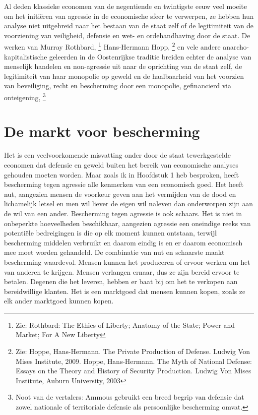 \documentclass[
  a5paper,
  smalldemyvopaper,11pt,twoside,onecolumn,openright,extrafontsizes,
hidelinks]{memoir}
\begin{document}
Al deden klassieke economen van de negentiende en twintigste eeuw veel
moeite om het initiëren van agressie in de economische sfeer te
verwerpen, ze hebben hun analyse niet uitgebreid naar het bestaan van de
staat zelf of de legitimiteit van de voorziening van veiligheid,
defensie en wet- en ordehandhaving door de staat. De werken van Murray
Rothbard, \footnote{Zie: Rothbard: The Ethics of Liberty; Anatomy of the
  State; Power and Market; For A New Liberty} Hans-Hermann Hopp,
\footnote{Zie: Hoppe, Hans-Hermann. The Private Production of Defense.
  Ludwig Von Mises Institute, 2009. Hoppe, Hans-Hermann. The Myth of
  National Defense: Essays on the Theory and History of Security
  Production. Ludwig Von Mises Institute, Auburn University, 2003} en
vele andere anarcho-kapitalistische geleerden in de Oostenrijkse
traditie breiden echter de analyse van menselijk handelen en
non-agressie uit naar de oprichting van de staat zelf, de legitimiteit
van haar monopolie op geweld en de haalbaarheid van het voorzien van
beveiliging, recht en bescherming door een monopolie, gefinancierd via
onteigening, \footnote{Noot van de vertalers: Ammous gebruikt een breed
  begrip van defensie dat zowel nationale of territoriale defensie als
  persoonlijke bescherming omvat.}

\section{De markt voor bescherming}\label{de-markt-voor-bescherming}

Het is een veelvoorkomende misvatting onder door de staat tewerkgestelde
economen dat defensie en geweld buiten het bereik van economische
analyses gehouden moeten worden. Maar zoals ik in Hoofdstuk 1 heb
besproken, heeft bescherming tegen agressie alle kenmerken van een
economisch goed. Het heeft nut, aangezien mensen de voorkeur geven aan
het vermijden van de dood en lichamelijk letsel en men wil liever de
eigen wil naleven dan onderworpen zijn aan de wil van een ander.
Bescherming tegen agressie is ook schaars. Het is niet in onbeperkte
hoeveelheden beschikbaar, aangezien agressie een oneindige reeks van
potentiële bedreigingen is die op elk moment kunnen ontstaan, terwijl
bescherming middelen verbruikt en daarom eindig is en er daarom
economisch mee moet worden gehandeld. De combinatie van nut en schaarste
maakt bescherming waardevol. Mensen kunnen het produceren of ervoor
werken om het van anderen te krijgen. Mensen verlangen ernaar, dus ze
zijn bereid ervoor te betalen. Degenen die het leveren, hebben er baat
bij om het te verkopen aan bereidwillige klanten. Het is een marktgoed
dat mensen kunnen kopen, zoals ze elk ander marktgoed kunnen kopen.
\end{document}
